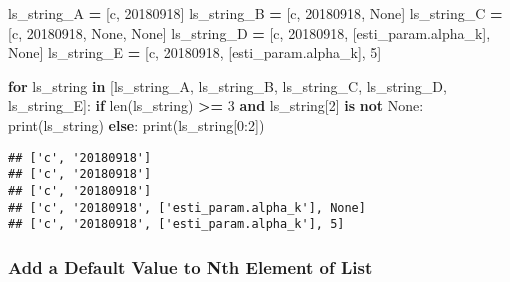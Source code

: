 \documentclass[
]{book}
\newenvironment{Shaded}{\begin{snugshade}}{\end{snugshade}}
\newcommand{\BuiltInTok}[1]{#1}
\newcommand{\ControlFlowTok}[1]{\textcolor[rgb]{0.13,0.29,0.53}{\textbf{#1}}}
\newcommand{\DecValTok}[1]{\textcolor[rgb]{0.00,0.00,0.81}{#1}}
\newcommand{\KeywordTok}[1]{\textcolor[rgb]{0.13,0.29,0.53}{\textbf{#1}}}
\newcommand{\NormalTok}[1]{#1}
\newcommand{\OperatorTok}[1]{\textcolor[rgb]{0.81,0.36,0.00}{\textbf{#1}}}
\newcommand{\StringTok}[1]{\textcolor[rgb]{0.31,0.60,0.02}{#1}}
\newcommand{\VariableTok}[1]{\textcolor[rgb]{0.00,0.00,0.00}{#1}}
\begin{document}
\begin{Shaded}
\begin{Highlighting}[]
\NormalTok{ls\_string\_A }\OperatorTok{=}\NormalTok{ [}\StringTok{\textquotesingle{}c\textquotesingle{}}\NormalTok{, }\StringTok{\textquotesingle{}20180918\textquotesingle{}}\NormalTok{]}
\NormalTok{ls\_string\_B }\OperatorTok{=}\NormalTok{ [}\StringTok{\textquotesingle{}c\textquotesingle{}}\NormalTok{, }\StringTok{\textquotesingle{}20180918\textquotesingle{}}\NormalTok{, }\VariableTok{None}\NormalTok{]}
\NormalTok{ls\_string\_C }\OperatorTok{=}\NormalTok{ [}\StringTok{\textquotesingle{}c\textquotesingle{}}\NormalTok{, }\StringTok{\textquotesingle{}20180918\textquotesingle{}}\NormalTok{, }\VariableTok{None}\NormalTok{, }\VariableTok{None}\NormalTok{]}
\NormalTok{ls\_string\_D }\OperatorTok{=}\NormalTok{ [}\StringTok{\textquotesingle{}c\textquotesingle{}}\NormalTok{, }\StringTok{\textquotesingle{}20180918\textquotesingle{}}\NormalTok{, [}\StringTok{\textquotesingle{}esti\_param.alpha\_k\textquotesingle{}}\NormalTok{], }\VariableTok{None}\NormalTok{]}
\NormalTok{ls\_string\_E }\OperatorTok{=}\NormalTok{ [}\StringTok{\textquotesingle{}c\textquotesingle{}}\NormalTok{, }\StringTok{\textquotesingle{}20180918\textquotesingle{}}\NormalTok{, [}\StringTok{\textquotesingle{}esti\_param.alpha\_k\textquotesingle{}}\NormalTok{], }\DecValTok{5}\NormalTok{]}

\ControlFlowTok{for}\NormalTok{ ls\_string }\KeywordTok{in}\NormalTok{ [ls\_string\_A, ls\_string\_B, ls\_string\_C, ls\_string\_D, ls\_string\_E]:}
  \ControlFlowTok{if} \BuiltInTok{len}\NormalTok{(ls\_string) }\OperatorTok{\textgreater{}=} \DecValTok{3} \KeywordTok{and}\NormalTok{ ls\_string[}\DecValTok{2}\NormalTok{] }\KeywordTok{is} \KeywordTok{not} \VariableTok{None}\NormalTok{:}
    \BuiltInTok{print}\NormalTok{(ls\_string)}
  \ControlFlowTok{else}\NormalTok{:}
    \BuiltInTok{print}\NormalTok{(ls\_string[}\DecValTok{0}\NormalTok{:}\DecValTok{2}\NormalTok{])}
  
\end{Highlighting}
\end{Shaded}

\begin{verbatim}
## ['c', '20180918']
## ['c', '20180918']
## ['c', '20180918']
## ['c', '20180918', ['esti_param.alpha_k'], None]
## ['c', '20180918', ['esti_param.alpha_k'], 5]
\end{verbatim}

\hypertarget{add-a-default-value-to-nth-element-of-list}{%
\subsubsection{Add a Default Value to Nth Element of List}\label{add-a-default-value-to-nth-element-of-list}}
\end{document}
